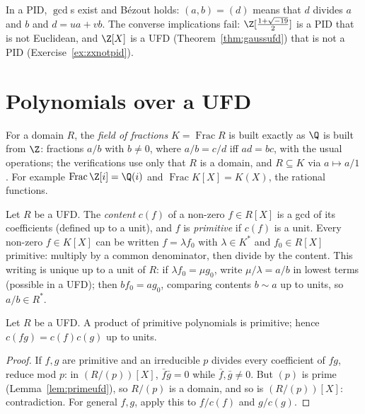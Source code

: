In a PID, $\gcd$s exist and Bézout holds: $(a,b)=(d)$ means that $d$ divides $a$ and $b$ and $d=ua+vb$. The converse implications fail: $\Z[\frac{1+\sqrt{-19}}2]$ is a PID that is not Euclidean, and $\Z[X]$ is a UFD (Theorem~\ref{thm:gaussufd}) that is not a PID (Exercise~\ref{ex:zxnotpid}).

\section{Polynomials over a UFD}

For a domain $R$, the \emph{field of fractions} $K=\operatorname{Frac}R$ is built exactly as $\Q$ is built from $\Z$: fractions $a/b$ with $b\ne0$, where $a/b=c/d$ iff $ad=bc$, with the usual operations; the verifications use only that $R$ is a domain, and $R\subseteq K$ via $a\mapsto a/1$. For example $\operatorname{Frac}\Z[i]=\Q(i)$ and $\operatorname{Frac}K[X]=K(X)$, the rational functions.

Let $R$ be a UFD. The \emph{content} $c(f)$ of a non-zero $f\in R[X]$ is a gcd of its coefficients (defined up to a unit), and $f$ is \emph{primitive} if $c(f)$ is a unit. Every non-zero $f\in K[X]$ can be written $f=\lambda f_0$ with $\lambda\in K^*$ and $f_0\in R[X]$ primitive: multiply by a common denominator, then divide by the content. This writing is unique up to a unit of $R$: if $\lambda f_0=\mu g_0$, write $\mu/\lambda=a/b$ in lowest terms (possible in a UFD); then $bf_0=ag_0$, comparing contents $b\sim a$ up to units, so $a/b\in R^*$.

\begin{lemma}[Gauss]\label{lem:gauss}
Let $R$ be a UFD. A product of primitive polynomials is primitive; hence $c(fg)=c(f)c(g)$ up to units.
\end{lemma}
\begin{proof}
If $f,g$ are primitive and an irreducible $p$ divides every coefficient of $fg$, reduce mod $p$: in $(R/(p))[X]$, $\bar f\bar g=0$ while $\bar f,\bar g\ne0$. But $(p)$ is prime (Lemma~\ref{lem:primeufd}), so $R/(p)$ is a domain, and so is $(R/(p))[X]$: contradiction. For general $f,g$, apply this to $f/c(f)$ and $g/c(g)$.
\end{proof}

